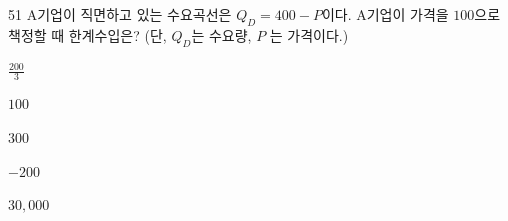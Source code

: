 \begin{question}{51}
A기업이 직면하고 있는 수요곡선은 $Q_{ D } =400-P$이다. A기업이 가격을 $100$으로 책정할 때 한계수입은? (단, $Q_{ D }$는 수요량, $P$ 는 가격이다.)
\begin{choices}
  \item $\frac{ 200 } { 3 }$
  \item $100$
  \item $300$
  \item $-200$
  \item $30,000$
\end{choices}
\end{question}
